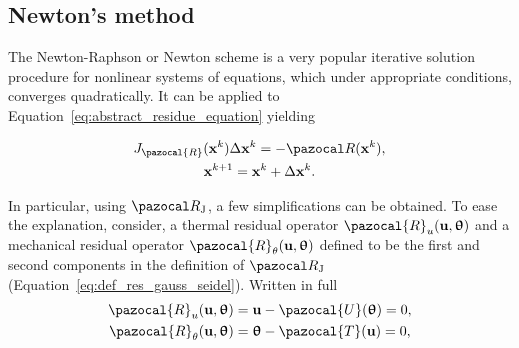\subsection{Newton's method}

The Newton-Raphson or Newton scheme is a very popular iterative solution procedure for nonlinear systems of equations, which under appropriate conditions, converges quadratically.
It can be applied to Equation~\eqref{eq:abstract_residue_equation} yielding
\begin{highlight}[innertopmargin=-5pt]
  \begin{gather}
    J_\pazocal{R}(\mathbf x^k)\Delta \mathbf x^k = - \pazocal R(\mathbf x^k), \label{eq:newton_system}\\
    \mathbf x^{k+1} = \mathbf x^k + \Delta \mathbf x^k. \label{eq:newton_iter}
  \end{gather}
\end{highlight}

In particular, using \(\pazocal R_\mathrm{J}\), a few simplifications can be obtained.
To ease the explanation, consider, a thermal residual operator $\pazocal{R}_{u}(\mathbf{u}, \bm{\uptheta})$ and a mechanical residual operator $\pazocal{R}_{\theta}(\mathbf{u}, \bm{\uptheta})$ defined to be the first and second components in the definition of \(\pazocal R_\mathrm{J}\) (Equation~\eqref{eq:def_res_gauss_seidel}).
Written in full
\begin{gather}
\pazocal{R}_{u}(\mathbf{u}, \bm{\uptheta})=\mathbf{u}-\pazocal{U}(\bm{\uptheta})=0, \\
\pazocal{R}_{\theta}(\mathbf{u}, \bm{\uptheta})=\bm{\uptheta}-\pazocal{T}(\mathbf{u})=0,
\end{gather}


